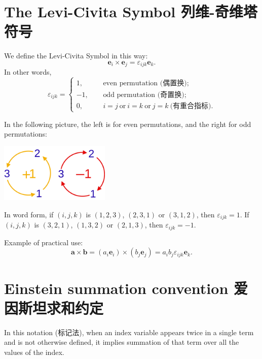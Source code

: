 \section{The Levi-Civita Symbol
列维-奇维塔符号}\label{the-levi-civita-symbol-ux5217ux7ef4-ux5947ux7ef4ux5854ux7b26ux53f7}

We define the Levi-Civita Symbol in this way:
\[\boldsymbol e_i \times \boldsymbol e_j = \varepsilon_{ijk} \boldsymbol e_k.\]
In other words, \[\varepsilon_{ijk} = \left\{
    \begin{aligned}
        1, & \ \ &\text{even permutation (偶置换)};  \\
        -1, & & \text{odd permutation (奇置换)};\\
        0, & & i=j \ \text{or} \ i = k \ \text{or} \ j = k \ \text{(有重合指标)}.
    \end{aligned}
\right.\]

In the following picture, the left is for even permutations, and the
right for odd permutations:

\begin{center}
    \includegraphics[height=80pt]{assets/Levi-Civita_Symbol.png}
\end{center}

In word form, if \((i,j,k)\) is \((1,2,3)\), \((2,3,1)\) or \((3,1,2)\),
then \(\varepsilon_{ijk} = 1\). If \((i,j,k)\) is \((3,2,1)\),
\((1,3,2)\) or \((2,1,3)\), then \(\varepsilon_{ijk} = -1\).

Example of practical use:
\[\boldsymbol a \times \boldsymbol b = (a_i \boldsymbol e_i) \times (b_j \boldsymbol e_j) = a_ib_j \varepsilon_{ijk} \boldsymbol e_k.\]

\section{Einstein summation convention
爱因斯坦求和约定}\label{einstein-summation-convention-ux7231ux56e0ux65afux5766ux6c42ux548cux7ea6ux5b9a}

In this notation (标记法), when an index variable appears twice in a
single term and is not otherwise defined, it implies summation of that
term over all the values of the index.


